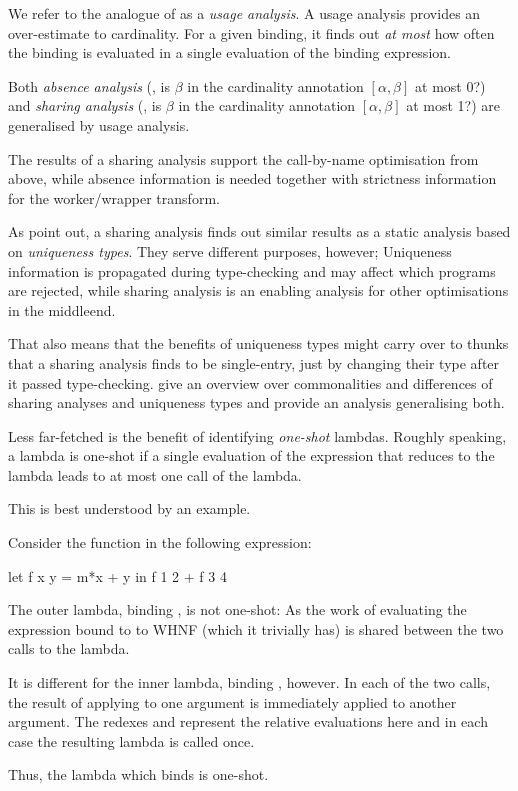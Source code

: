 We refer to the analogue of \MaxCard as a \emph{usage analysis}.
A usage analysis provides an over-estimate to cardinality.
For a given binding, it finds out \emph{at most} how often the binding is evaluated in a single evaluation of the binding expression.

Both \emph{absence analysis} (\eg, is $\beta$ in the cardinality annotation $[\alpha, \beta]$ at most 0?) and \emph{sharing analysis} (\eg, is $\beta$ in the cardinality annotation $[\alpha, \beta]$ at most 1?) are generalised by usage analysis.

The results of a sharing analysis support the call-by-name optimisation from above, while absence information is needed together with strictness information for the worker/wrapper transform.

As \textcite[Section~2.4]{verstoep} point out, a sharing analysis finds out similar results as a static analysis based on \emph{uniqueness types}.
They serve different purposes, however; Uniqueness information is propagated during type-checking and may affect which programs are rejected, while sharing analysis is an enabling analysis for other optimisations in the middleend.

That also means that the benefits of uniqueness types might carry over to thunks that a sharing analysis finds to be single-entry, just by changing their type after it passed type-checking.
\textcite{sharing} give an overview over commonalities and differences of sharing analyses and uniqueness types and provide an analysis generalising both.

Less far-fetched is the benefit of identifying \emph{one-shot} lambdas.
Roughly speaking, a lambda is one-shot if a single evaluation of the expression that reduces to the lambda leads to at most one call of the lambda.

This is best understood by an example.

\begin{example}
  Consider the function  in the following expression:
  \begin{haskellcode}
    let f x y = m*x + y
    in f 1 2 + f 3 4
  \end{haskellcode}

  The outer lambda, binding , is not one-shot:
  As the work of evaluating the expression bound to  to WHNF (which it trivially has) is shared between the two calls to the lambda.

  It is different for the inner lambda, binding , however.
  In each of the two calls, the result of applying  to one argument is immediately applied to another argument. The redexes  and  represent the relative evaluations here and in each case the resulting lambda is called once.
  
  Thus, the lambda which binds  is one-shot.
\end{example}

